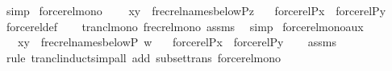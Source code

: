 \begin{isabellebody}
\ simp%
\endisatagproof
{\isafoldproof}%
%
\isadelimproof
\isanewline
%
\endisadelimproof
\isanewline
{}\isamarkupfalse%
\ forcerel{\isacharunderscore}{\kern0pt}mono{}\ {\isacharcolon}{\kern0pt}\isanewline
\ \ \ {\isachardoublequoteopen}{\isasymlangle}x{\isacharcomma}{\kern0pt}y{\isasymrangle}\ {\isasymin}\ frecrel{\isacharparenleft}{\kern0pt}names{\isacharunderscore}{\kern0pt}below{\isacharparenleft}{\kern0pt}P{\isacharcomma}{\kern0pt}z{\isacharparenright}{\kern0pt}{\isacharparenright}{\kern0pt}{\isachardoublequoteclose}\isanewline
\ \ \ {\isachardoublequoteopen}forcerel{\isacharparenleft}{\kern0pt}P{\isacharcomma}{\kern0pt}x{\isacharparenright}{\kern0pt}\ {\isasymsubseteq}\ forcerel{\isacharparenleft}{\kern0pt}P{\isacharcomma}{\kern0pt}y{\isacharparenright}{\kern0pt}{\isachardoublequoteclose}\isanewline
%
\isadelimproof
\ \ %
\endisadelimproof
%
\isatagproof
{}\isamarkupfalse%
\ forcerel{\isacharunderscore}{\kern0pt}def\isanewline
\ \ \isamarkupfalse%
\ trancl{\isacharunderscore}{\kern0pt}mono\ frecrel{\isacharunderscore}{\kern0pt}mono\ assms\ \isamarkupfalse%
\ simp%
\endisatagproof
{\isafoldproof}%
%
\isadelimproof
\isanewline
%
\endisadelimproof
\isanewline
{}\isamarkupfalse%
\ forcerel{\isacharunderscore}{\kern0pt}mono{\isacharunderscore}{\kern0pt}aux\ {\isacharcolon}{\kern0pt}\isanewline
\ \ \ {\isachardoublequoteopen}{\isasymlangle}x{\isacharcomma}{\kern0pt}y{\isasymrangle}\ {\isasymin}\ frecrel{\isacharparenleft}{\kern0pt}names{\isacharunderscore}{\kern0pt}below{\isacharparenleft}{\kern0pt}P{\isacharcomma}{\kern0pt}\ w{\isacharparenright}{\kern0pt}{\isacharparenright}{\kern0pt}{\isacharcircum}{\kern0pt}{\isacharplus}{\kern0pt}{\isachardoublequoteclose}\isanewline
\ \ \ {\isachardoublequoteopen}forcerel{\isacharparenleft}{\kern0pt}P{\isacharcomma}{\kern0pt}x{\isacharparenright}{\kern0pt}\ {\isasymsubseteq}\ forcerel{\isacharparenleft}{\kern0pt}P{\isacharcomma}{\kern0pt}y{\isacharparenright}{\kern0pt}{\isachardoublequoteclose}\isanewline
%
\isadelimproof
\ \ %
\endisadelimproof
%
\isatagproof
{}\isamarkupfalse%
\ assms\isanewline
\ \ \isamarkupfalse%
\ {\isacharparenleft}{\kern0pt}rule\ trancl{\isacharunderscore}{\kern0pt}induct{\isacharcomma}{\kern0pt}simp{\isacharunderscore}{\kern0pt}all\ add{\isacharcolon}{\kern0pt}\ subset{\isacharunderscore}{\kern0pt}trans\ forcerel{\isacharunderscore}{\kern0pt}mono{}{\isacharparenright}{\kern0pt}%

\end{isabellebody}
